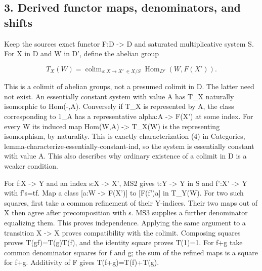 \subsection{\texorpdfstring{3. Derived functor maps,\allowbreak{} denominators,\allowbreak{} and shifts}{3. Derived functor   and shifts}}\label{proofs-4166-5089-derived-functor-maps-denominators-and-shifts}

Keep the source\textquotesingle s exact functor F:\allowbreak{}D \allowbreak{}-> D\textquotesingle{} and saturated multiplicative system S. For X in D and W in D',\allowbreak{} define the abelian group

\[
 T_X(W)=\mathop{\operatorname{colim}}_{s:X\to X'\ \in X/S}
             \operatorname{Hom}_{D'}(W,F(X')).                 \tag{3.1}
\]

This is a colimit of abelian groups,\allowbreak{} not a presumed colimit in D\textquotesingle. The latter need not exist. An essentially constant system with value A has T\_\allowbreak{}X naturally isomorphic to Hom(-,\allowbreak{}A)\allowbreak{}. Conversely if T\_\allowbreak{}X is represented by A,\allowbreak{} the class corresponding to 1\_\allowbreak{}A has a representative alpha:\allowbreak{}A \allowbreak{}-> F(X')\allowbreak{} at some index. For every W its induced map Hom(W,\allowbreak{}A)\allowbreak{} \allowbreak{}-> T\_\allowbreak{}X(W)\allowbreak{} is the representing isomorphism,\allowbreak{} by naturality. This is exactly characterization (4)\allowbreak{} in Categories,\allowbreak{} lemma-characterize-essentially-constant-ind,\allowbreak{} so the system is essentially constant with value A. This also describes why ordinary existence of a colimit in D\textquotesingle{} is a weaker condition.

For f:\allowbreak{}X \allowbreak{}-> Y and an index s:\allowbreak{}X \allowbreak{}-> X',\allowbreak{} MS2 gives t:\allowbreak{}Y \allowbreak{}-> Y\textquotesingle{} in S and f':\allowbreak{}X' \allowbreak{}-> Y\textquotesingle{} with f's\allowbreak{}=tf. Map a class [a:\allowbreak{}W \allowbreak{}-> F(X')\allowbreak{}]\allowbreak{} to [F(f')\allowbreak{}a]\allowbreak{} in T\_\allowbreak{}Y(W)\allowbreak{}. For two such squares,\allowbreak{} first take a common refinement of their Y-indices. Their two maps out of X\textquotesingle{} then agree after precomposition with s. MS3 supplies a further denominator equalizing them. This proves independence. Applying the same argument to a transition X\textquotesingle{} \allowbreak{}-> X\textquotesingle\textquotesingle{} proves compatibility with the colimit. Composing squares proves T(gf)\allowbreak{}\allowbreak{}=T(g)\allowbreak{}T(f)\allowbreak{},\allowbreak{} and the identity square proves T(1)\allowbreak{}\allowbreak{}=1. For f\allowbreak{}+g take common denominator squares for f and g; the sum of the refined maps is a square for f\allowbreak{}+g. Additivity of F gives T(f\allowbreak{}+g)\allowbreak{}\allowbreak{}=T(f)\allowbreak{}\allowbreak{}+T(g)\allowbreak{}.


